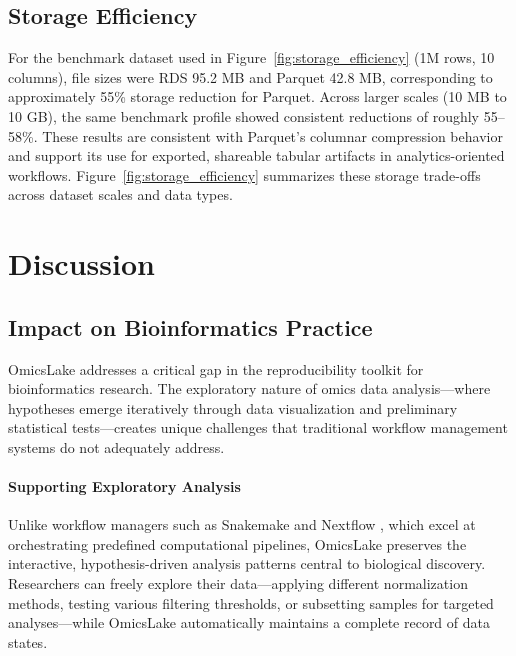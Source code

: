 \documentclass[11pt,a4paper]{article}
\begin{document}

\subsection{Storage Efficiency}

For the benchmark dataset used in Figure~\ref{fig:storage_efficiency} (1M rows, 10 columns), file sizes were RDS 95.2 MB and Parquet 42.8 MB, corresponding to approximately 55\% storage reduction for Parquet. Across larger scales (10 MB to 10 GB), the same benchmark profile showed consistent reductions of roughly 55--58\%. These results are consistent with Parquet's columnar compression behavior and support its use for exported, shareable tabular artifacts in analytics-oriented workflows.
Figure~\ref{fig:storage_efficiency} summarizes these storage trade-offs across dataset scales and data types.


\section{Discussion}

\subsection{Impact on Bioinformatics Practice}

OmicsLake addresses a critical gap in the reproducibility toolkit for bioinformatics research. The exploratory nature of omics data analysis---where hypotheses emerge iteratively through data visualization and preliminary statistical tests---creates unique challenges that traditional workflow management systems do not adequately address.

\paragraph{Supporting Exploratory Analysis}
Unlike workflow managers such as Snakemake \citep{koster2012snakemake} and Nextflow \citep{di2017nextflow}, which excel at orchestrating predefined computational pipelines, OmicsLake preserves the interactive, hypothesis-driven analysis patterns central to biological discovery. Researchers can freely explore their data---applying different normalization methods, testing various filtering thresholds, or subsetting samples for targeted analyses---while OmicsLake automatically maintains a complete record of data states.
\end{document}
